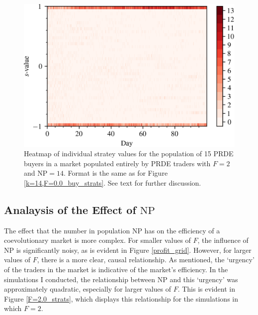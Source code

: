 \documentclass[conference]{IEEEtran}
\begin{document}
\begin{figure}[htbp]
    \centerline{\includegraphics[width=\columnwidth]{k=14,F=2.0_buy_strats.png}}
    \caption{
        Heatmap of individual stratey values for the population of 15 PRDE buyers in a market populated entirely by PRDE traders with $F=2$ and $\mathrm{NP}=14$.
        Format is the same as for Figure \ref{k=14,F=0.0_buy_strats}.
        See text for further discussion.
    }
    \label{k=14,F=2.0_buy_strats}
\end{figure}

\subsection{Analaysis of the Effect of $\mathrm{NP}$}

The effect that the number in population $\mathrm{NP}$ has on the efficiency of a coevolutionary market is more complex. 
For smaller values of $F$, the influence of $\mathrm{NP}$ is significantly noisy, as is evident in Figure \ref{profit_grid}.
However, for larger values of $F$, there is a more clear, causal relationship.
As mentioned, the `urgency' of the traders in the market is indicative of the market's efficiency.
In the simulations I conducted, the relationship between $\mathrm{NP}$ and this `urgency' was approximately quadratic, especially for larger values of $F$.
This is evident in Figure \ref{F=2.0_strats}, which displays this relationship for the simulations in which $F=2$.
\end{document}
